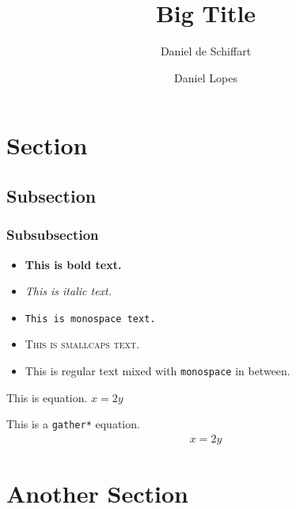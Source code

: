 \documentclass[english,palatino,purist]{ist-report}
\begin{document}
\pagestyle{style2}

\title{Big Title}
\author{Daniel de Schiffart \and Daniel Lopes}

\section{Section}

\lipsum[1]

\subsection{Subsection}

\lipsum[1-2]

\subsubsection{Subsubsection}

\begin{itemize}
	\item \textbf{This is bold text.}
	\item \textit{This is italic text.}
	\item \texttt{This is monospace text.}
	\item \textsc{This is smallcaps text.}
	\item This is regular text mixed with \texttt{monospace} in between.
\end{itemize}

This is equation. $x = 2y$

This is a \texttt{gather*} equation.
\begin{gather*}
	x = 2y
\end{gather*}

\section{Another Section}

\lipsum[1-3]
\end{document}
